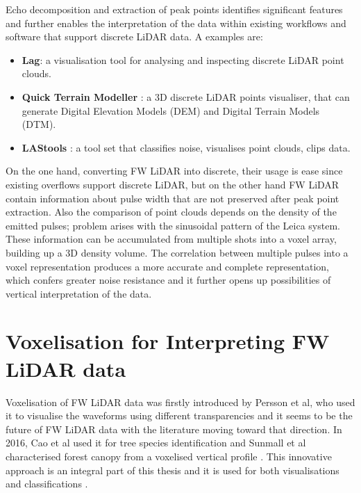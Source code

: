 \documentclass{subfiles}
\begin{document}
	\par  Echo decomposition and extraction of peak points identifies significant features and further enables the interpretation of the data within existing workflows and software that support discrete LiDAR data. A examples are: 
	
	\begin{itemize}
	\item \textbf{Lag}: a visualisation tool for analysing and inspecting discrete LiDAR point clouds. 
	
	\item \textbf{Quick Terrain Modeller} : a 3D discrete LiDAR points visualiser, that can generate Digital Elevation Models (DEM) and Digital Terrain Models (DTM).
	
	\item \textbf{LAStools} : a tool set that classifies noise, visualises point clouds, clips data.  
	\end{itemize}
		
	\par On the one hand, converting FW LiDAR into discrete, their usage is ease since existing overflows support discrete LiDAR, but on the other hand FW LiDAR contain information about pulse width that are not preserved after peak point extraction. Also the comparison of point clouds depends on the density of the emitted pulses; problem arises with the sinusoidal pattern of the Leica system. These information can be accumulated from multiple shots into a voxel array, building up a 3D density volume. The correlation between multiple pulses into a voxel representation produces a more accurate and complete representation, which confers greater noise resistance and it further opens up possibilities of vertical interpretation of the data. 
	
		
	 \section{Voxelisation for Interpreting FW LiDAR data}\label{Voxelisation}
		
	\par Voxelisation of FW LiDAR data was firstly introduced by Persson et al, who used it to visualise the waveforms using different transparencies \cite{Persson2005} and it seems to be the future of FW LiDAR data with the literature moving toward that direction. In 2016, Cao et al used it for tree species identification \cite{Cao2016} and Sunmall et al characterised forest canopy from a voxelised vertical profile \cite{Sumnall2016}. This innovative approach is an integral part of this thesis and it is used for both visualisations and classifications \cite{Miltiadou2014}\cite{Miltiadou2015}. 
\end{document}
